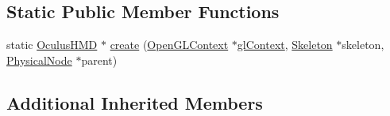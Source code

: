 \subsection*{Static Public Member Functions}
\begin{DoxyCompactItemize}
\item 
static \hyperlink{classmotorcar_1_1OculusHMD}{Oculus\-H\-M\-D} $\ast$ \hyperlink{classmotorcar_1_1OculusHMD_aa77e2ef2bda8701075d5e669c95cc3ce}{create} (\hyperlink{classmotorcar_1_1OpenGLContext}{Open\-G\-L\-Context} $\ast$\hyperlink{classmotorcar_1_1Display_a884dd0b78dbecee82a33eb6d26a2a403}{gl\-Context}, \hyperlink{classmotorcar_1_1Skeleton}{Skeleton} $\ast$skeleton, \hyperlink{classmotorcar_1_1PhysicalNode}{Physical\-Node} $\ast$parent)
\end{DoxyCompactItemize}
\subsection*{Additional Inherited Members}



